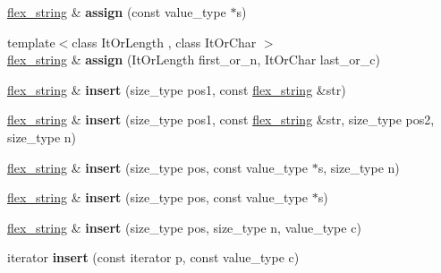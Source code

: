 \begin{DoxyCompactItemize}
\item 
\hypertarget{classflex__string_a5e597de370673605035a0164f5db63d4}{}\hyperlink{classflex__string}{flex\+\_\+string} \& {\bfseries assign} (const value\+\_\+type $\ast$s)\label{classflex__string_a5e597de370673605035a0164f5db63d4}

\item 
\hypertarget{classflex__string_a994d97d2724fe8a60e2f2d3910797631}{}{\footnotesize template$<$class It\+Or\+Length , class It\+Or\+Char $>$ }\\\hyperlink{classflex__string}{flex\+\_\+string} \& {\bfseries assign} (It\+Or\+Length first\+\_\+or\+\_\+n, It\+Or\+Char last\+\_\+or\+\_\+c)\label{classflex__string_a994d97d2724fe8a60e2f2d3910797631}

\item 
\hypertarget{classflex__string_aacd704c0d3e1ab40df08047a21b3c1c7}{}\hyperlink{classflex__string}{flex\+\_\+string} \& {\bfseries insert} (size\+\_\+type pos1, const \hyperlink{classflex__string}{flex\+\_\+string} \&str)\label{classflex__string_aacd704c0d3e1ab40df08047a21b3c1c7}

\item 
\hypertarget{classflex__string_ab4e70d467ff71d2dd40f5f3524fc4767}{}\hyperlink{classflex__string}{flex\+\_\+string} \& {\bfseries insert} (size\+\_\+type pos1, const \hyperlink{classflex__string}{flex\+\_\+string} \&str, size\+\_\+type pos2, size\+\_\+type n)\label{classflex__string_ab4e70d467ff71d2dd40f5f3524fc4767}

\item 
\hypertarget{classflex__string_a83b819622c5a7eb8e089ade6cef5a856}{}\hyperlink{classflex__string}{flex\+\_\+string} \& {\bfseries insert} (size\+\_\+type pos, const value\+\_\+type $\ast$s, size\+\_\+type n)\label{classflex__string_a83b819622c5a7eb8e089ade6cef5a856}

\item 
\hypertarget{classflex__string_a7df35328684b21fe76a38859d01e9049}{}\hyperlink{classflex__string}{flex\+\_\+string} \& {\bfseries insert} (size\+\_\+type pos, const value\+\_\+type $\ast$s)\label{classflex__string_a7df35328684b21fe76a38859d01e9049}

\item 
\hypertarget{classflex__string_abd52cde511b6c181d1bb43caa0d28297}{}\hyperlink{classflex__string}{flex\+\_\+string} \& {\bfseries insert} (size\+\_\+type pos, size\+\_\+type n, value\+\_\+type c)\label{classflex__string_abd52cde511b6c181d1bb43caa0d28297}

\item 
\hypertarget{classflex__string_a46805fc7ee83ea9f933cf9b3219974d4}{}iterator {\bfseries insert} (const iterator p, const value\+\_\+type c)\label{classflex__string_a46805fc7ee83ea9f933cf9b3219974d4}


\end{DoxyCompactItemize}
